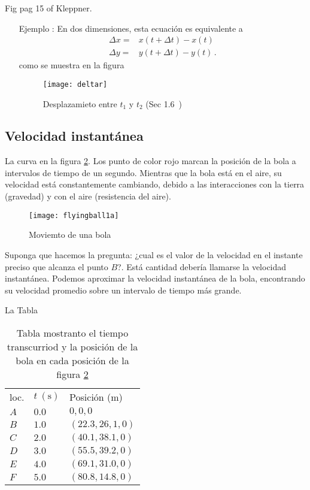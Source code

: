 \begin{inprogress}
  Fig pag 15 of Kleppner.
\end{inprogress}

\begin{itemize}
\item[Ejemplo]: En dos dimensiones, esta ecuaci\'on es equivalente a
  \begin{align}
    \Delta x=&x(t+\Delta t)-x(t)\nonumber\\
    \Delta y=&y(t+\Delta t)-y(t)\,.
  \end{align}
  como se muestra en la figura~\cite{fig:deltar}
  \begin{figure}
    \centering
    \texttt{[image: deltar]}
    \caption{Desplazamieto entre $t_1$ y $t_2$ (Sec 1.6~\cite{Kleppner})}
    \label{fig:deltar}
  \end{figure}

\end{itemize}

\subsection{Velocidad instantánea}

La curva en la figura \ref{fig:flyingball1a}. Los punto de color rojo marcan la posición de la bola a intervalos de tiempo de un segundo. Mientras que la bola está en el aire, su velocidad está constantemente cambiando, debido a las interacciones con la tierra (gravedad) y con el aire (resistencia del aire). 
\begin{figure}
  \centering
  \texttt{[image: flyingball1a]}
  \caption{Moviemto de una bola}
  \label{fig:flyingball1a}
\end{figure}

Suponga que hacemos la pregunta: ¿cual es el valor de la velocidad en el instante preciso que alcanza el punto $B$?. Está cantidad debería llamarse la velocidad instantánea. Podemos aproximar la velocidad instantánea de la bola, encontrando su velocidad promedio sobre un intervalo de tiempo más grande. 

La Tabla

\begin{table}
  \centering
  \begin{tabular}{|l|l|l|}
    loc. & $t\ (\text{s})$ & Posición (m)\\
    $A$ & $0.0$ &$0,0,0$ \\
    $B$ & $1.0$ &$(22.3,26,1,0)$ \\
    $C$ & $2.0$ &$(40.1,38.1,0)$ \\
    $D$ & $3.0$ &$(55.5,39.2,0)$ \\
    $E$ & $4.0$ &$(69.1,31.0,0)$ \\
    $F$ & $5.0$ &$(80.8,14.8,0)$ \\
  \end{tabular}
  \caption{Tabla mostranto el tiempo transcurriod y la posición de la bola en cada posición de la figura \ref{fig:flyingball1a}}
  \label{tab:flyingball1a}
\end{table}

